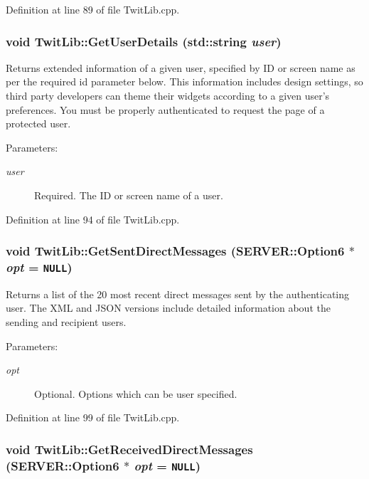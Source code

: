 Definition at line 89 of file TwitLib.cpp.\hypertarget{classTwitLib_87f38173a3602ee392350b17977c99fe}{
\subsubsection{\setlength{\rightskip}{0pt plus 5cm}void TwitLib::GetUserDetails (std::string {\em user})}}
\label{classTwitLib_87f38173a3602ee392350b17977c99fe}


Returns extended information of a given user, specified by ID or screen name as per the required id parameter below. This information includes design settings, so third party developers can theme their widgets according to a given user's preferences. You must be properly authenticated to request the page of a protected user. \begin{Desc}
\item[Parameters:]
\begin{description}
\item[{\em user}]Required. The ID or screen name of a user. \end{description}
\end{Desc}


Definition at line 94 of file TwitLib.cpp.\hypertarget{classTwitLib_23f41783466fe193e6d2394475d9e282}{
\subsubsection{\setlength{\rightskip}{0pt plus 5cm}void TwitLib::GetSentDirectMessages ({\bf SERVER::Option6} $\ast$ {\em opt} = {\tt NULL})}}
\label{classTwitLib_23f41783466fe193e6d2394475d9e282}


Returns a list of the 20 most recent direct messages sent by the authenticating user. The XML and JSON versions include detailed information about the sending and recipient users. \begin{Desc}
\item[Parameters:]
\begin{description}
\item[{\em opt}]Optional. Options which can be user specified. \end{description}
\end{Desc}


Definition at line 99 of file TwitLib.cpp.\hypertarget{classTwitLib_6a98347a2c1e93dff60543a6a45da4b3}{
\subsubsection{\setlength{\rightskip}{0pt plus 5cm}void TwitLib::GetReceivedDirectMessages ({\bf SERVER::Option6} $\ast$ {\em opt} = {\tt NULL})}}
\label{classTwitLib_6a98347a2c1e93dff60543a6a45da4b3}


